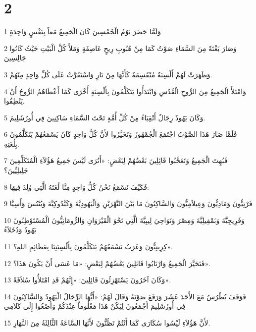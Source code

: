 \chapter{2}

\par 1 وَلَمَّا حَضَرَ يَوْمُ الْخَمْسِينَ كَانَ الْجَمِيعُ مَعاً بِنَفْسٍ وَاحِدَةٍ
\par 2 وَصَارَ بَغْتَةً مِنَ السَّمَاءِ صَوْتٌ كَمَا مِنْ هُبُوبِ رِيحٍ عَاصِفَةٍ وَمَلأَ كُلَّ الْبَيْتِ حَيْثُ كَانُوا جَالِسِينَ
\par 3 وَظَهَرَتْ لَهُمْ أَلْسِنَةٌ مُنْقَسِمَةٌ كَأَنَّهَا مِنْ نَارٍ وَاسْتَقَرَّتْ عَلَى كُلِّ وَاحِدٍ مِنْهُمْ.
\par 4 وَامْتَلأَ الْجَمِيعُ مِنَ الرُّوحِ الْقُدُسِ وَابْتَدَأُوا يَتَكَلَّمُونَ بِأَلْسِنَةٍ أُخْرَى كَمَا أَعْطَاهُمُ الرُّوحُ أَنْ يَنْطِقُوا.
\par 5 وَكَانَ يَهُودٌ رِجَالٌ أَتْقِيَاءُ مِنْ كُلِّ أُمَّةٍ تَحْتَ السَّمَاءِ سَاكِنِينَ فِي أُورُشَلِيمَ.
\par 6 فَلَمَّا صَارَ هَذَا الصَّوْتُ اجْتَمَعَ الْجُمْهُورُ وَتَحَيَّرُوا لأَنَّ كُلَّ وَاحِدٍ كَانَ يَسْمَعُهُمْ يَتَكَلَّمُونَ بِلُغَتِهِ.
\par 7 فَبُهِتَ الْجَمِيعُ وَتَعَجَّبُوا قَائِلِينَ بَعْضُهُمْ لِبَعْضٍ: «أَتُرَى لَيْسَ جَمِيعُ هَؤُلاَءِ الْمُتَكَلِّمِينَ جَلِيلِيِّينَ؟
\par 8 فَكَيْفَ نَسْمَعُ نَحْنُ كُلُّ وَاحِدٍ مِنَّا لُغَتَهُ الَّتِي وُلِدَ فِيهَا:
\par 9 فَرْتِيُّونَ وَمَادِيُّونَ وَعِيلاَمِيُّونَ وَالسَّاكِنُونَ مَا بَيْنَ النَّهْرَيْنِ وَالْيَهُودِيَّةَ وَكَبَّدُوكِيَّةَ وَبُنْتُسَ وَأَسِيَّا
\par 10 وَفَرِيجِيَّةَ وَبَمْفِيلِيَّةَ وَمِصْرَ وَنَوَاحِيَ لِيبِيَّةَ الَّتِي نَحْوَ الْقَيْرَوَانِ وَالرُّومَانِيُّونَ الْمُسْتَوْطِنُونَ يَهُودٌ وَدُخَلاَءُ
\par 11 كِرِيتِيُّونَ وَعَرَبٌ نَسْمَعُهُمْ يَتَكَلَّمُونَ بِأَلْسِنَتِنَا بِعَظَائِمِ اللهِ؟».
\par 12 فَتَحَيَّرَ الْجَمِيعُ وَارْتَابُوا قَائلِينَ بَعْضُهُمْ لِبَعْضٍ: «مَا عَسَى أَنْ يَكُونَ هَذَا؟».
\par 13 وَكَانَ آخَرُونَ يَسْتَهْزِئُونَ قَائِلِينَ: «إِنَّهُمْ قَدِ امْتَلأُوا سُلاَفَةً».
\par 14 فَوَقَفَ بُطْرُسُ مَعَ الأَحَدَ عَشَرَ وَرَفَعَ صَوْتَهُ وَقَالَ لَهُمْ: «أَيُّهَا الرِّجَالُ الْيَهُودُ وَالسَّاكِنُونَ فِي أُورُشَلِيمَ أَجْمَعُونَ لِيَكُنْ هَذَا مَعْلُوماً عِنْدَكُمْ وَأَصْغُوا إِلَى كَلاَمِي
\par 15 لأَنَّ هَؤُلاَءِ لَيْسُوا سُكَارَى كَمَا أَنْتُمْ تَظُنُّونَ لأَنَّهَا السَّاعَةُ الثَّالِثَةُ مِنَ النَّهَارِ.
